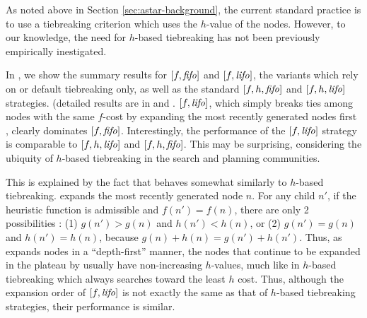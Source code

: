 \label{sec:noh}
As noted above in Section \ref{sec:astar-background}, the current standard practice is to use a tiebreaking criterion which uses the $h$-value of the nodes. However, to our knowledge, the need for $h$-based tiebreaking has not been previously empirically inestigated.

In , we show the summary results for $[f, {\text{\textit{fifo}}}]$ and $[f, {\text{\textit{lifo}}}]$, the
\astar variants which rely on \fifo or \lifo default tiebreaking only, as well as the standard $[f, h, {\text{\textit{fifo}}}]$ and $[f, h, {\text{\textit{lifo}}}]$ strategies.
(detailed results are in
 and .
$[f,{\text{\textit{lifo}}}]$, which simply breaks ties among nodes with the same
$f$-cost by expanding the most recently generated nodes first
\cite{korf1985depth}, clearly dominates $[f,{\text{\textit{fifo}}}]$.  Interestingly,
the performance of the $[f,{\text{\textit{lifo}}}]$ strategy is comparable to
$[f,h,{\text{\textit{lifo}}}]$ and $[f,h,{\text{\textit{fifo}}}]$.  This may be surprising, considering
the ubiquity of $h$-based tiebreaking in the search and planning
communities.

This is explained by the fact that 
\lifo behaves somewhat similarly to $h$-based tiebreaking.
\lifo expands the most recently generated node $n$.
For any child $n'$, 
if the heuristic function is admissible and $f(n') = f(n)$, there are only 2 possibilities :
(1) $g(n') > g(n)$ and $h(n') < h(n)$, or
(2) $g(n') = g(n)$ and $h(n') = h(n)$,
because $g(n)+h(n)=g(n')+h(n')$.
Thus, as \lifo expands nodes in a ``depth-first'' manner,
the nodes that continue to be expanded in the plateau by \lifo usually   %
have non-increasing $h$-values,
much like in $h$-based tiebreaking which always searches toward the least $h$ cost.
Thus, although the expansion order of $[f,{\text{\textit{lifo}}}]$ is not exactly the same as that of $h$-based tiebreaking strategies,
their performance is similar.



